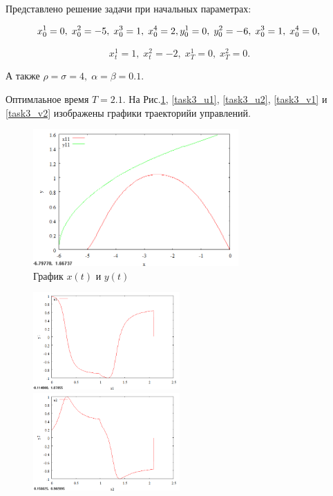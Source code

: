 \documentclass[14pt]{article}
\begin{document}
Представлено решение задачи при начальных параметрах:

$$
    x^1_0 = 0,\; x^2_0 = -5,\; x^3_0 = 1,\; x^4_0 = 2, \\
    y^1_0 = 0,\; y^2_0 = -6,\; x^3_0 = 1,\; x^4_0 = 0, \\
$$

$$
    x^1_t = 1,\; x^2_t = -2,\; x^1_T = 0,\; x^2_T = 0.
$$

А также $\rho = \sigma = 4,\; \alpha = \beta = 0.1$.

Оптимлаьное время $ T = 2.1 $. На Рис.\ref{task3_xy}, \ref{task3_u1}, \ref{task3_u2}, \ref{task3_v1} и \ref{task3_v2} изображены графики траекторийи управлений.

\begin{figure}
\centering
\includegraphics[width=0.7\textwidth]{task3_xy}
\caption{График $x(t)$ и $y(t)$}
\label{task3_xy}
\end{figure}

\begin{figure}
\begin{floatrow}
    {\includegraphics[width=0.5\textwidth]{task3_u1}}
    {\includegraphics[width=0.5\textwidth]{task3_u2}}
\end{floatrow}
\end{figure}
\end{document}
